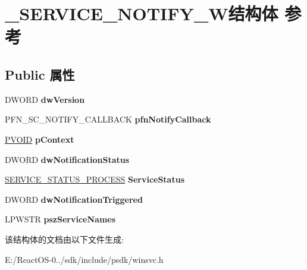 \hypertarget{struct___s_e_r_v_i_c_e___n_o_t_i_f_y__2_w}{}\section{\+\_\+\+S\+E\+R\+V\+I\+C\+E\+\_\+\+N\+O\+T\+I\+F\+Y\+\_\+W结构体 参考}
\label{struct___s_e_r_v_i_c_e___n_o_t_i_f_y__2_w}
\subsection*{Public 属性}
\begin{DoxyCompactItemize}
\item 
\mbox{\label{struct___s_e_r_v_i_c_e___n_o_t_i_f_y__2_w_a25c65370e09a9c706f43f32a7bd99d26}} 
D\+W\+O\+RD {\bfseries dw\+Version}
\item 
\mbox{\label{struct___s_e_r_v_i_c_e___n_o_t_i_f_y__2_w_acffe4c5cf7d8818b5d06702103557786}} 
P\+F\+N\+\_\+\+S\+C\+\_\+\+N\+O\+T\+I\+F\+Y\+\_\+\+C\+A\+L\+L\+B\+A\+CK {\bfseries pfn\+Notify\+Callback}
\item 
\mbox{\label{struct___s_e_r_v_i_c_e___n_o_t_i_f_y__2_w_aac8539b45c0f9ff2932d92e6c7fd717b}} 
\hyperlink{interfacevoid}{P\+V\+O\+ID} {\bfseries p\+Context}
\item 
\mbox{\label{struct___s_e_r_v_i_c_e___n_o_t_i_f_y__2_w_a1a0b9108150642e440d7414b5912c321}} 
D\+W\+O\+RD {\bfseries dw\+Notification\+Status}
\item 
\mbox{\label{struct___s_e_r_v_i_c_e___n_o_t_i_f_y__2_w_a6c946f6b3b336849cce2c14c0f27ba69}} 
\hyperlink{struct___s_e_r_v_i_c_e___s_t_a_t_u_s___p_r_o_c_e_s_s}{S\+E\+R\+V\+I\+C\+E\+\_\+\+S\+T\+A\+T\+U\+S\+\_\+\+P\+R\+O\+C\+E\+SS} {\bfseries Service\+Status}
\item 
\mbox{\label{struct___s_e_r_v_i_c_e___n_o_t_i_f_y__2_w_a65de01fc80a1e9950c7e2be51baf6eff}} 
D\+W\+O\+RD {\bfseries dw\+Notification\+Triggered}
\item 
\mbox{\label{struct___s_e_r_v_i_c_e___n_o_t_i_f_y__2_w_a4c563f155d7aa6a31a1d690b1da5658e}} 
L\+P\+W\+S\+TR {\bfseries psz\+Service\+Names}
\end{DoxyCompactItemize}


该结构体的文档由以下文件生成\+:\begin{DoxyCompactItemize}
\item 
E\+:/\+React\+O\+S-\/0../sdk/include/psdk/winsvc.\+h\end{DoxyCompactItemize}
